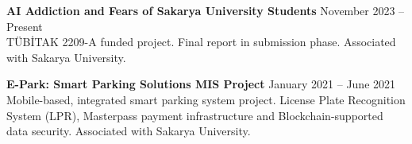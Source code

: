 \documentclass[a4paper,8pt]{article}
\begin{document}
\vspace{3pt}

\textbf{AI Addiction and Fears of Sakarya University Students} \hfill {\small November 2023 -- Present}\\
{\small TÜBİTAK 2209-A funded project. Final report in submission phase. Associated with Sakarya University.}

\vspace{3pt}

\textbf{E-Park: Smart Parking Solutions MIS Project} \hfill {\small January 2021 -- June 2021}\\
{\small Mobile-based, integrated smart parking system project. License Plate Recognition System (LPR), Masterpass payment infrastructure and Blockchain-supported data security. Associated with Sakarya University.}

\end{document}
